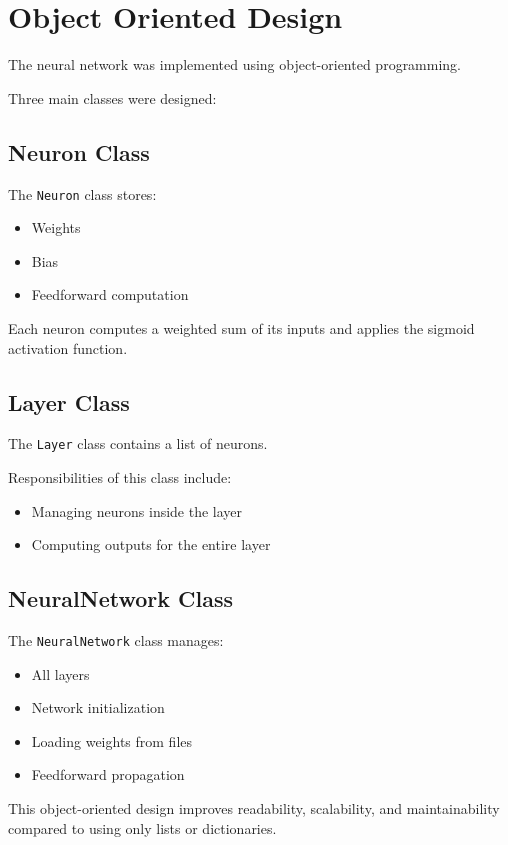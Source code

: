 \documentclass[12pt]{article}
\begin{document}
\section{Object Oriented Design}

The neural network was implemented using object-oriented programming.

Three main classes were designed:

\subsection{Neuron Class}

The \texttt{Neuron} class stores:
\begin{itemize}
    \item Weights
    \item Bias
    \item Feedforward computation
\end{itemize}

Each neuron computes a weighted sum of its inputs and applies the sigmoid activation function.

\subsection{Layer Class}

The \texttt{Layer} class contains a list of neurons.

Responsibilities of this class include:
\begin{itemize}
    \item Managing neurons inside the layer
    \item Computing outputs for the entire layer
\end{itemize}

\subsection{NeuralNetwork Class}

The \texttt{NeuralNetwork} class manages:
\begin{itemize}
    \item All layers
    \item Network initialization
    \item Loading weights from files
    \item Feedforward propagation
\end{itemize}

This object-oriented design improves readability, scalability, and maintainability compared to using only lists or dictionaries.
\end{document}
